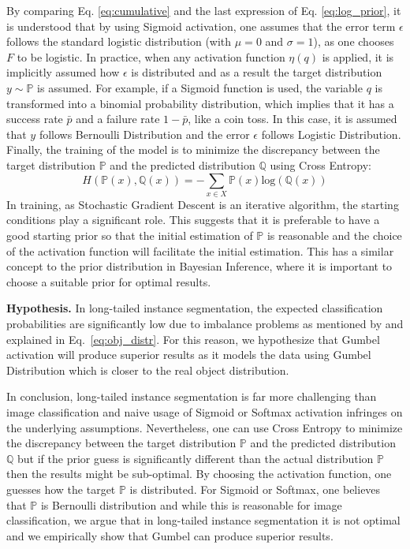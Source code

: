 \documentclass[runningheads]{llncs}
\begin{document}
By comparing Eq. \ref{eq:cumulative} and the last expression of Eq. \ref{eq:log_prior}, it is understood that by using Sigmoid activation, one assumes that the error term $\epsilon$ follows the standard logistic distribution (with $\mu=0$ and $\sigma=1$), as one chooses $F$ to be logistic.
In practice, when any activation function $\eta(q)$ is applied, it is implicitly assumed how $\epsilon$ is distributed and as a result the target distribution $y\sim\mathbb{P}$ is assumed. For example, if a Sigmoid function is used, the variable $q$ is transformed into a binomial probability distribution, which implies that it has a success rate $\bar{p}$ and a failure rate $1-\bar{p}$, like a coin toss. In this case, it is assumed that $y$ follows Bernoulli Distribution and the error $\epsilon$ follows Logistic Distribution. Finally, the training of the model is to minimize the discrepancy between the target distribution $\mathbb{P}$ and the predicted distribution $\mathbb{Q}$ using Cross Entropy:
\begin{equation}
    H(\mathbb{P}(x),\mathbb{Q}(x))= -\sum_{x \in X} \mathbb{P}(x) \text{log}(\mathbb{Q}(x))
    \label{cross_entropy}
\end{equation}
In training, as Stochastic Gradient Descent is an iterative algorithm, the starting conditions play a significant role. This suggests that it is preferable to have a good starting prior so that the initial estimation of $\mathbb{P}$ is reasonable and the choice of the activation function will facilitate the initial estimation. This has a similar concept to the prior distribution in Bayesian Inference, where it is important to choose a suitable prior for optimal results. 



\noindent\textbf{Hypothesis.} In long-tailed instance segmentation, the expected classification probabilities are significantly low due to imbalance problems as mentioned by \cite{oksuz2020imbalance} and explained in Eq.~\ref{eq:obj_distr}. For this reason, we hypothesize that Gumbel activation will produce superior results as it models the data using Gumbel Distribution which is closer to the real object distribution.

In conclusion, long-tailed instance segmentation is far more challenging than image classification and naive usage of Sigmoid or Softmax activation infringes on the underlying assumptions. 
Nevertheless, one can use Cross Entropy  to minimize the discrepancy between the target distribution $\mathbb{P}$ and the predicted distribution $\mathbb{Q}$
but if the prior guess is significantly different than the actual distribution $\mathbb{P}$ then the results might be sub-optimal. By choosing the activation function, one guesses how the target $\mathbb{P}$ is distributed. For Sigmoid or Softmax, one believes that $\mathbb{P}$ is Bernoulli distribution and while this is reasonable for image classification, we argue that in long-tailed instance segmentation it is not optimal and we empirically show that Gumbel can produce superior results.
\end{document}
